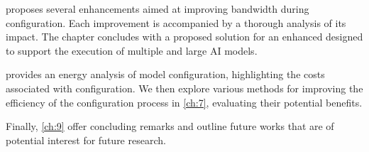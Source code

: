  proposes several \confignoc{} enhancements aimed at improving bandwidth during configuration.
Each improvement is accompanied by a thorough analysis of its impact.
The chapter concludes with a proposed solution for an enhanced \confignoc{} designed to support the execution of multiple and large AI models.

 provides an energy analysis of model configuration, highlighting the costs associated with configuration. 
We then explore various methods for improving the efficiency of the configuration process in \cref{ch:7}, evaluating their potential benefits.


Finally, \cref{ch:9} offer concluding remarks and outline future works that are of potential interest for future research.




